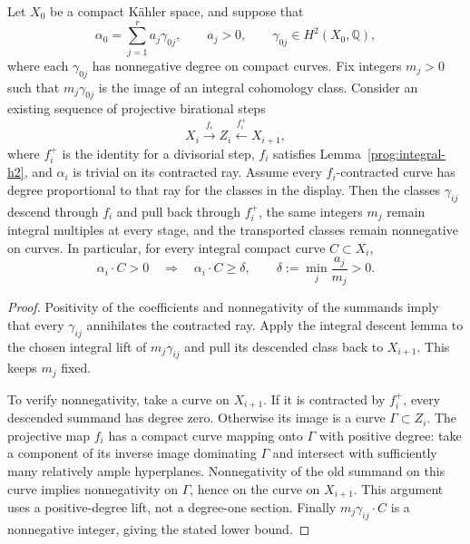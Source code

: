 \begin{lemma}
\label{prog:fixed-integral-grid}
Let $X_0$ be a compact K\"ahler space, and suppose that
\[
 \alpha_0=\sum_{j=1}^r a_j\gamma_{0j},\qquad a_j>0,
 \qquad \gamma_{0j}\in H^2(X_0,\mathbb Q),
\]
where each $\gamma_{0j}$ has nonnegative degree on compact curves.
Fix integers $m_j>0$ such that $m_j\gamma_{0j}$ is the image of an
integral cohomology class. Consider an existing sequence of projective
birational steps
\[
 X_i\xrightarrow{f_i}Z_i\xleftarrow{f_i^+}X_{i+1},
\]
where $f_i^+$ is the identity for a divisorial step, $f_i$ satisfies
Lemma~\ref{prog:integral-h2}, and $\alpha_i$ is trivial on its
contracted ray. Assume every $f_i$-contracted curve has degree
proportional to that ray for the classes in the display. Then the
classes $\gamma_{ij}$ descend through $f_i$ and pull back through
$f_i^+$, the same integers $m_j$ remain integral multiples at every
stage, and the transported classes remain nonnegative on curves.
In particular, for every integral compact curve $C\subset X_i$,
\[
 \alpha_i\cdot C>0\quad\Longrightarrow\quad
 \alpha_i\cdot C\geq\delta,
 \qquad \delta:=\min_j\frac{a_j}{m_j}>0.
\]
\end{lemma}

\begin{proof}
Positivity of the coefficients and nonnegativity of the summands imply
that every $\gamma_{ij}$ annihilates the contracted ray. Apply the
integral descent lemma to the chosen integral lift of
$m_j\gamma_{ij}$ and pull its descended class back to $X_{i+1}$.
This keeps $m_j$ fixed.

To verify nonnegativity, take a curve on $X_{i+1}$. If it is contracted
by $f_i^+$, every descended summand has degree zero. Otherwise its
image is a curve $\Gamma\subset Z_i$. The projective map $f_i$ has a
compact curve mapping onto $\Gamma$ with positive degree: take a
component of its inverse image dominating $\Gamma$ and intersect with
sufficiently many relatively ample hyperplanes. Nonnegativity of the
old summand on this curve implies nonnegativity on $\Gamma$, hence on
the curve on $X_{i+1}$. This argument uses a positive-degree lift, not
a degree-one section. Finally $m_j\gamma_{ij}\cdot C$ is a
nonnegative integer, giving the stated lower bound.
\end{proof}

